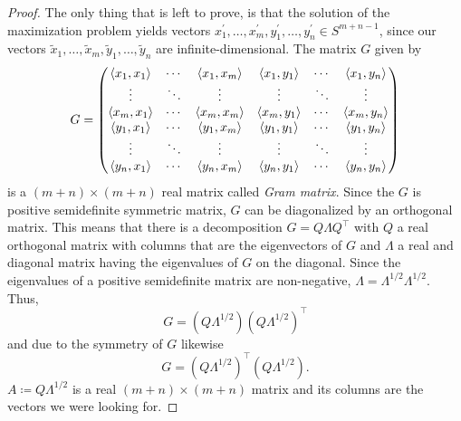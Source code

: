 \begin{proof}
	The only thing that is left to prove, is that the solution of the maximization problem yields vectors $x_1^\prime,\dots,x_m^\prime, y_1^\prime,\dots,y_n^\prime\in S^{m+n-1}$, since our vectors $\tilde{x}_1,\dots,\tilde{x}_m,\tilde{y}_1,\dots,\tilde{y}_n$ are infinite-dimensional. The matrix $G$ given by
	\begin{equation}
		G=\begin{pmatrix}
			\langle{x_1},{x_1}\rangle & \cdots & \langle{x_1},{x_m}\rangle& \langle{x_1},{y_1}\rangle & \cdots & \langle{x_1},{y_n}\rangle \\
			 \vdots		& \ddots	& \vdots & \vdots & \ddots & \vdots\\
			 \langle{x_m},{x_1}\rangle & \cdots & \langle{x_m},{x_m}\rangle& \langle{x_m},{y_1}\rangle & \cdots & \langle{x_m},{y_n}\rangle \\
			\langle{y_1},{x_1}\rangle & \cdots & \langle{y_1},{x_m}\rangle& \langle{y_1},{y_1}\rangle & \cdots & \langle{y_1},{y_n}\rangle \\
			 \vdots		& \ddots	& \vdots& \vdots & \ddots & \vdots\\
			 \langle{y_n},{x_1}\rangle & \cdots & \langle{y_n},{x_m}\rangle& \langle{y_n},{y_1}\rangle & \cdots & \langle{y_n},{y_n}\rangle 
		\end{pmatrix}
	\end{equation}
	is a $(m+n)\times (m+n)$ real matrix called \emph{Gram matrix}. Since the $G$ is positive semidefinite symmetric matrix, $G$ can be diagonalized by an orthogonal matrix. This means that there is a decomposition $G=Q\Lambda Q^\top$ with $Q$ a real orthogonal matrix with columns that are the eigenvectors of $G$ and $\Lambda$ a real and diagonal matrix having the eigenvalues of $G$ on the diagonal. Since the eigenvalues of a positive semidefinite matrix are non-negative, $\Lambda=\Lambda^{1/2}\Lambda^{1/2}$. Thus,
	\[
		G=(Q\Lambda^{1/2})(Q\Lambda^{1/2})^\top		
	\]
	and due to the symmetry of $G$ likewise
	\[
		G=(Q\Lambda^{1/2})^\top(Q\Lambda^{1/2}).	
	\]
	$A\coloneqq Q\Lambda^{1/2}$ is a real $(m+n)\times (m+n)$ matrix and its columns are the vectors we were looking for.
\end{proof}
